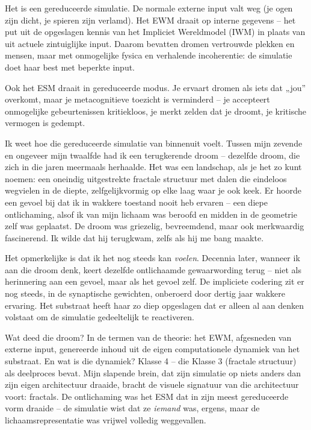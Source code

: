\documentclass[11pt, twoside, openright]{book}
\begin{document}
Het is een gereduceerde simulatie. De normale externe input valt weg (je ogen zijn dicht, je spieren zijn verlamd). Het EWM draait op interne gegevens -- het put uit de opgeslagen kennis van het Impliciet Wereldmodel (IWM) in plaats van uit actuele zintuiglijke input. Daarom bevatten dromen vertrouwde plekken en mensen, maar met onmogelijke fysica en verhalende incoherentie: de simulatie doet haar best met beperkte input.

Ook het ESM draait in gereduceerde modus. Je ervaart dromen als iets dat „jou” overkomt, maar je metacognitieve toezicht is verminderd -- je accepteert onmogelijke gebeurtenissen kritiekloos, je merkt zelden dat je droomt, je kritische vermogen is gedempt.

Ik weet hoe die gereduceerde simulatie van binnenuit voelt. Tussen mijn zevende en ongeveer mijn twaalfde had ik een terugkerende droom -- dezelfde droom, die zich in die jaren meermaals herhaalde. Het was een landschap, als je het zo kunt noemen: een oneindig uitgestrekte fractale structuur met dalen die eindeloos wegvielen in de diepte, zelfgelijkvormig op elke laag waar je ook keek. Er hoorde een gevoel bij dat ik in wakkere toestand nooit heb ervaren -- een diepe ontlichaming, alsof ik van mijn lichaam was beroofd en midden in de geometrie zelf was geplaatst. De droom was griezelig, bevreemdend, maar ook merkwaardig fascinerend. Ik wilde dat hij terugkwam, zelfs als hij me bang maakte.

Het opmerkelijke is dat ik het nog steeds kan \textit{voelen}. Decennia later, wanneer ik aan die droom denk, keert dezelfde ontlichaamde gewaarwording terug -- niet als herinnering aan een gevoel, maar als het gevoel zelf. De impliciete codering zit er nog steeds, in de synaptische gewichten, onberoerd door dertig jaar wakkere ervaring. Het substraat heeft haar zo diep opgeslagen dat er alleen al aan denken volstaat om de simulatie gedeeltelijk te reactiveren.

Wat deed die droom? In de termen van de theorie: het EWM, afgesneden van externe input, genereerde inhoud uit de eigen computationele dynamiek van het substraat. En wat is die dynamiek? Klasse 4 -- die Klasse 3 (fractale structuur) als deelproces bevat. Mijn slapende brein, dat zijn simulatie op niets anders dan zijn eigen architectuur draaide, bracht de visuele signatuur van die architectuur voort: fractals. De ontlichaming was het ESM dat in zijn meest gereduceerde vorm draaide -- de simulatie wist dat ze \textit{iemand} was, ergens, maar de lichaamsrepresentatie was vrijwel volledig weggevallen.
\end{document}
